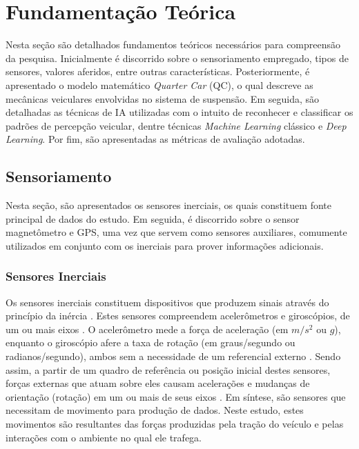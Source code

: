 \chapter{Fundamentação Teórica}
\label{cap:fundamentacao}

Nesta seção são detalhados fundamentos teóricos necessários para compreensão da pesquisa. Inicialmente é discorrido sobre o sensoriamento empregado, tipos de sensores, valores aferidos, entre outras características. Posteriormente, é apresentado o modelo matemático \textit{Quarter Car} (QC), o qual descreve as mecânicas veiculares envolvidas no sistema de suspensão. Em seguida, são detalhadas as técnicas de IA utilizadas com o intuito de reconhecer e classificar os padrões de percepção veicular, dentre técnicas \textit{Machine Learning} clássico e \textit{Deep Learning}. Por fim, são apresentadas as métricas de avaliação adotadas.

\section{Sensoriamento}

Nesta seção, são apresentados os sensores inerciais, os quais constituem fonte principal de dados do estudo. Em seguida, é discorrido sobre o sensor magnetômetro e GPS, uma vez que servem como sensores auxiliares, comumente utilizados em conjunto com os inerciais para prover informações adicionais. 

\subsection{Sensores Inerciais}

Os sensores inerciais constituem dispositivos que produzem sinais através do princípio da inércia \cite{Braga2017}. Estes sensores compreendem acelerômetros e giroscópios, de um ou mais eixos \cite{Beeby2004}. O acelerômetro mede a força de aceleração (em $m/s^2$ ou $g$), enquanto  o giroscópio afere a taxa de rotação (em graus/segundo ou radianos/segundo), ambos sem a necessidade de um referencial externo \cite{Groves2013}. Sendo assim, a partir de um quadro de referência ou posição inicial destes sensores, forças externas que atuam sobre eles causam acelerações e mudanças de orientação (rotação) em um ou mais de seus eixos \cite{Kempe2011}. Em síntese, são sensores que necessitam de movimento para produção de dados. Neste estudo, estes movimentos são resultantes das forças produzidas pela tração do veículo e pelas interações com o ambiente no qual ele trafega.

